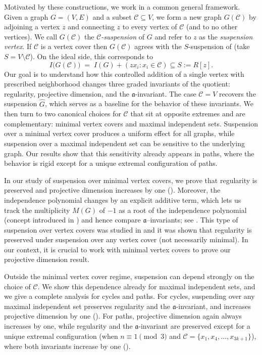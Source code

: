\documentclass[12pt]{amsart}
\theoremstyle{plain}
\theoremstyle{definition}
\begin{document}
Motivated by these constructions, we work in a common general framework.
Given a graph $G=(V,E)$ and a subset $\mathcal C\subseteq V$, we form a new graph $G(\mathcal C)$ by adjoining a vertex $z$ and connecting $z$ to every vertex of $\mathcal C$ (and to no other vertices).
We call $G(\mathcal C)$ the \emph{$\mathcal C$-suspension} of $G$ and refer to $z$ as the \emph{suspension vertex}.
If $\mathcal C$ is a vertex cover then $G(\mathcal C)$ agrees with the $S$-suspension of \cite{IndMatch} (take $S=V\setminus \mathcal C$).
On the ideal side, this corresponds to
\[
I\bigl(G(\mathcal C)\bigr) \;=\; I(G) + (z x_i : x_i \in \mathcal C) \subseteq S:=R[z].
\]
Our goal is to understand how this controlled addition of a single vertex with prescribed neighborhood
changes three graded invariants of the quotient: regularity, projective dimension, and the $\mathfrak a$-invariant.
The case $\mathcal{C}=V$ recovers the suspension $\widehat{G}$, which serves as a baseline for the behavior of these invariants.
We then turn to two canonical choices for $\mathcal{C}$ that sit at opposite extremes and are complementary:
minimal vertex covers and maximal independent sets.  Suspension over a minimal vertex cover produces a uniform
effect for all graphs, while suspension over a maximal independent set can be sensitive to the underlying graph.
Our results show that this sensitivity already appears in paths, where the
behavior is rigid except for a unique extremal configuration of paths.



In our study of suspension over minimal vertex covers, we prove that
regularity is preserved and projective dimension increases by one ().  Moreover, the independence
polynomial changes by an explicit additive term, which lets us track the multiplicity $M(G)$ of $-1$ as a
root of the independence polynomial (concept introduced in \cite{biermann2026realizableregdeghpairs}) and hence compare $\mathfrak a$--invariants; see . This type of suspension over vertex covers was studied in \cite{IndMatch} and it was shown that regularity is preserved under suspension over any vertex cover (not necessarily minimal). In our context, it is crucial to work with minimal vertex covers to prove our projective dimension result. 


Outside the minimal vertex cover regime, suspension can depend strongly on the choice of $\mathcal{C}$.
We show this dependence already for maximal independent sets, and we give a complete analysis for
cycles and paths.  For cycles, suspending over any maximal independent set preserves regularity and the
$\mathfrak a$-invariant, and increases projective dimension by one ().
For paths, projective dimension again always increases by one, while regularity and the
$\mathfrak a$-invariant are preserved except for a unique extremal configuration  (when $n\equiv 1 \pmod 3$ and $\mathcal C=\{x_1,x_4,\dots,x_{3k+1}\}$), where both
invariants increase by one ().
\end{document}
